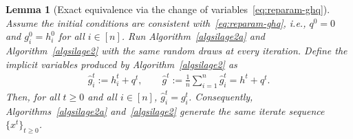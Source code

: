 \documentclass{article}
\newcommand{\eqdef}{:=}
\theoremstyle{plain}
\newtheorem{lemma}{Lemma}
\begin{document}
\begin{lemma}[Exact equivalence via the change of variables~\eqref{eq:reparam-ghq}]
\label{lem:equiv-alg2a-alg2}
Assume the initial conditions are consistent with~\eqref{eq:reparam-ghq}, i.e., $q^0=0$ and $g_i^0=h_i^0$ for all $i\in[n]$.
Run Algorithm~\ref{algsilage2a} and Algorithm~\ref{algsilage2} with the same random draws at every iteration.
Define the implicit variables produced by Algorithm~\ref{algsilage2} as
\begin{align}
\label{eq:implicit-g-from-hq}
\widehat g_i^t\eqdef h_i^t+q^t,\qquad
\widehat g^t\eqdef \frac1n\sum_{i=1}^n \widehat g_i^t=h^t+q^t.
\end{align}
Then, for all $t\ge 0$ and all $i\in[n]$, $\widehat g_i^t=g_i^t$.
Consequently, Algorithms~\ref{algsilage2a} and~\ref{algsilage2} generate the same iterate sequence $\{x^t\}_{t\ge 0}$.
\end{lemma}
\end{document}
